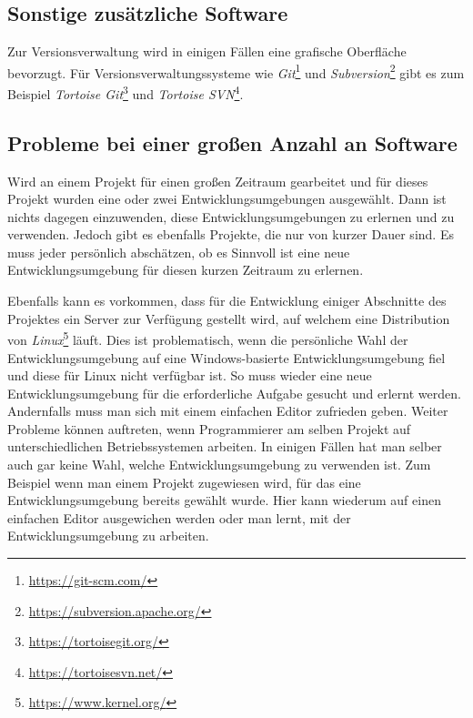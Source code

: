 \subsection{Sonstige zusätzliche Software}
Zur Versionsverwaltung wird in einigen Fällen eine grafische
Oberfläche bevorzugt. Für Versionsverwaltungssysteme wie
\textit{Git}\footnote{\url{https://git-scm.com/}} und
\textit{Subversion}\footnote{\url{https://subversion.apache.org/}}
gibt es zum Beispiel \textit{Tortoise
  Git}\footnote{\url{https://tortoisegit.org/}} und \textit{Tortoise
  SVN}\footnote{\url{https://tortoisesvn.net/}}.\\

\subsection{Probleme bei einer großen Anzahl an Software}
Wird an einem Projekt für einen großen Zeitraum gearbeitet und für
dieses Projekt wurden eine oder zwei Entwicklungsumgebungen
ausgewählt. Dann ist nichts dagegen einzuwenden, diese
Entwicklungsumgebungen zu erlernen und zu verwenden. Jedoch gibt es
ebenfalls Projekte, die nur von kurzer Dauer sind. Es muss jeder
persönlich abschätzen, ob es Sinnvoll ist eine neue
Entwicklungsumgebung für diesen kurzen Zeitraum zu erlernen.

Ebenfalls kann es vorkommen, dass für die Entwicklung einiger
Abschnitte des Projektes ein Server zur Verfügung gestellt wird, auf
welchem eine Distribution von
\textit{Linux}\footnote{\url{https://www.kernel.org/}} läuft. Dies ist
problematisch, wenn die persönliche Wahl der Entwicklungsumgebung auf
eine Windows-basierte Entwicklungsumgebung fiel und diese für Linux
nicht verfügbar ist. So muss wieder eine neue Entwicklungsumgebung für
die erforderliche Aufgabe gesucht und erlernt werden. Andernfalls muss
man sich mit einem einfachen Editor zufrieden geben. Weiter Probleme
können auftreten, wenn Programmierer am selben Projekt auf
unterschiedlichen Betriebssystemen arbeiten. In einigen Fällen hat man
selber auch gar keine Wahl, welche Entwicklungsumgebung zu verwenden
ist. Zum Beispiel wenn man einem Projekt zugewiesen wird, für das eine
Entwicklungsumgebung bereits gewählt wurde. Hier kann wiederum auf
einen einfachen Editor ausgewichen werden oder man lernt, mit der
Entwicklungsumgebung zu arbeiten.\\

